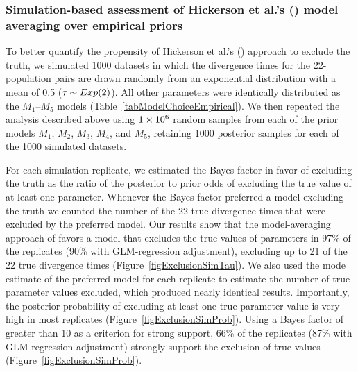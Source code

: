 

\subsubsection{Simulation-based assessment of Hickerson et al.'s
    (\citeyear{Hickerson2013}) model averaging over empirical priors}

To better quantify the propensity of Hickerson et al.'s
(\citeyear{Hickerson2013}) approach to exclude the truth, we simulated 1000
datasets in which the divergence times for the 22-population pairs are drawn
randomly from an exponential distribution with a mean of 0.5 ($\tau_{} \sim
Exp(2)$).
All other parameters were identically distributed as the $M_1$--$M_5$ models
(Table~\ref{tabModelChoiceEmpirical}).
We then repeated the analysis described above using $1\times 10^{6}$ random samples from
each of the prior models $M_1$, $M_2$, $M_3$, $M_4$, and $M_5$, retaining 1000
posterior samples for each of the 1000 simulated datasets.

For each simulation replicate, we estimated the Bayes factor in favor
of excluding the truth as the ratio of the posterior to prior odds of
excluding the true value of at least one parameter.
Whenever the Bayes factor preferred a model excluding the truth we counted the
number of the 22 true divergence times that were excluded by the preferred
model.
Our results show that the model-averaging approach of \citet{Hickerson2013}
favors a model that excludes the true values of parameters in 97\% of the
replicates (90\% with GLM-regression adjustment), excluding up to 21 of the 22
true divergence times (Figure~\ref{figExclusionSimTau}).
We also used the mode estimate of the preferred model for each replicate to
estimate the number of true parameter values excluded, which produced nearly
identical results.
Importantly, the posterior probability of excluding at least one true parameter
value is very high in most replicates
(Figure~\ref{figExclusionSimProb}).
Using a Bayes factor of greater than 10 as a criterion for strong support, 66\%
of the replicates (87\% with GLM-regression adjustment) strongly support the
exclusion of true values (Figure~\ref{figExclusionSimProb}).

